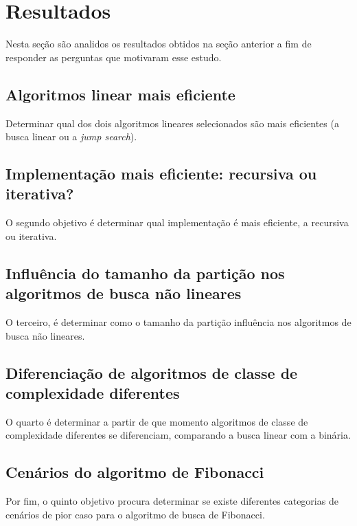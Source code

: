 \chapter{Resultados}

Nesta seção são analidos os resultados obtidos na seção anterior a fim de responder as perguntas que motivaram esse estudo.

\section{Algoritmos linear mais eficiente}

Determinar qual dos dois algoritmos lineares selecionados são mais eficientes (a busca linear ou a {\it jump search}).


\section{Implementação mais eficiente: recursiva ou iterativa?}

O segundo objetivo é determinar qual implementação é mais eficiente, a recursiva ou iterativa.



\section{Influência do tamanho da partição nos algoritmos de busca não lineares}

O terceiro, é determinar como o tamanho da partição influência nos algoritmos de busca não lineares.


\section{Diferenciação de algoritmos de classe de complexidade diferentes}

O quarto é determinar a partir de que momento algoritmos de classe de complexidade diferentes se diferenciam, comparando a busca linear com a binária.


\section{Cenários do algoritmo de Fibonacci}

Por fim, o quinto objetivo procura determinar se existe diferentes categorias de cenários de pior caso para o algoritmo de busca de Fibonacci.
